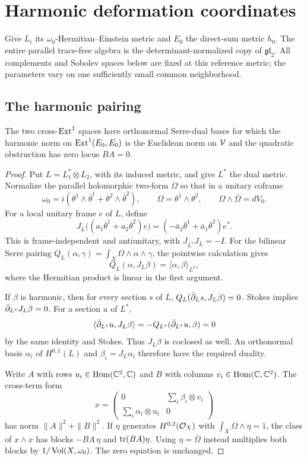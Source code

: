 \section{Harmonic deformation coordinates}\label{sec:coordinates}

Give $L_i$ its $\omega_0$-Hermitian--Einstein metric and $E_0$ the
direct-sum metric $h_0$. The entire parallel trace-free algebra is the
determinant-normalized copy of $\mathfrak{gl}_2$. All complements and
Sobolev spaces below are fixed at this reference metric; the parameters
vary on one sufficiently small common neighborhood.

\subsection{The harmonic pairing}

\begin{lemma}\label{lem:pairing}
The two cross-$\operatorname{Ext}^1$ spaces have orthonormal Serre-dual bases for
which the harmonic norm on $\operatorname{Ext}^1(E_0,E_0)$ is the Euclidean norm
on $\mathcal V$ and the quadratic obstruction has zero locus $BA=0$.
\end{lemma}

\begin{proof}
Put $L=L_1^*\otimes L_2$, with its induced metric, and give $L^*$
the dual metric. Normalize the parallel holomorphic two-form $\Omega$
so that in a unitary coframe
\[
\omega_0=i(\theta^1\wedge\bar\theta^1+\theta^2\wedge\bar\theta^2),
\qquad \Omega=\theta^1\wedge\theta^2,\qquad
\Omega\wedge\bar\Omega=dV_0.
\]
For a local unitary frame $e$ of $L$, define
\[
J_L\bigl((a_1\bar\theta^1+a_2\bar\theta^2)e\bigr)
=(-\bar a_2\bar\theta^1+\bar a_1\bar\theta^2)e^*.
\]
This is frame-independent and antiunitary, with $J_{L^*}J_L=-I$.
For the bilinear Serre pairing
$Q_L(\alpha,\gamma)=\int_X\Omega\wedge\alpha\wedge\gamma$,
the pointwise calculation gives
\begin{equation}\label{eq:Serre-unitary}
Q_L(\alpha,J_L\beta)=\langle\alpha,\beta\rangle_{L^2},
\end{equation}
where the Hermitian product is linear in the first argument.

If $\beta$ is harmonic, then for every section $s$ of $L$,
$Q_L(\bar\partial_Ls,J_L\beta)=0$. Stokes implies
$\bar\partial_{L^*}J_L\beta=0$. For a section $u$ of $L^*$,
\[
\langle\bar\partial_{L^*}u,J_L\beta\rangle
=-Q_{L^*}(\bar\partial_{L^*}u,\beta)=0
\]
by the same identity and Stokes. Thus $J_L\beta$ is coclosed as well.
An orthonormal basis $\alpha_i$ of $H^{0,1}(L)$ and
$\beta_i=J_L\alpha_i$ therefore have the required duality.

Write $A$ with rows $u_i\in\operatorname{Hom}(\mathbb C^2,\mathbb C)$ and $B$ with
columns $v_i\in\operatorname{Hom}(\mathbb C,\mathbb C^2)$. The cross-term form
\[
x=\begin{pmatrix}
0&\sum_i\beta_i\otimes v_i\\
\sum_i\alpha_i\otimes u_i&0
\end{pmatrix}
\]
has norm $\|A\|^2+\|B\|^2$. If $\eta$ generates
$H^{0,2}(\mathcal O_X)$ with $\int_X\Omega\wedge\eta=1$, the class of
$x\wedge x$ has blocks $-BA\,\eta$ and $\operatorname{tr}(BA)\eta$.
Using $\eta=\bar\Omega$ instead multiplies both blocks by
$1/\operatorname{Vol}(X,\omega_0)$. The zero equation is unchanged.
\end{proof}

